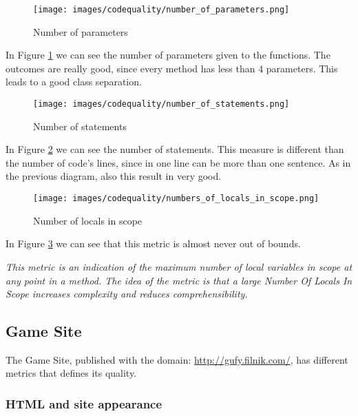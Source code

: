 \begin{figure}[H]
\centering %
\texttt{[image: images/codequality/number\_of\_parameters.png]}
\caption{Number of parameters}
\label{fig:numberOfParameters}
\end{figure}

In Figure \ref{fig:numberOfParameters} we can see the number of parameters given to the functions. The outcomes are really good, since every method has less than 4 parameters. This leads to a good class separation.

\begin{figure}[H]
\centering %
\texttt{[image: images/codequality/number\_of\_statements.png]}
\caption{Number of statements}
\label{fig:numberOfStatements}
\end{figure}

In Figure \ref{fig:numberOfStatements} we can see the number of statements. This measure is different than the number of code's lines, since in one line can be more than one sentence. As in the previous diagram, also this result in very good.

\begin{figure}[H]
\centering %
\texttt{[image: images/codequality/numbers\_of\_locals\_in\_scope.png]}
\caption{Number of locals in scope}
\label{fig:numberOfLocalsInScope}
\end{figure}

In Figure \ref{fig:numberOfLocalsInScope} we can see that this metric is almost never out of bounds.

\textit{This metric is an indication of the maximum number of local variables in scope at any point in a method. The idea of the metric is that a large Number Of Locals In Scope increases complexity and reduces comprehensibility.}\cite{website:eclipse-metrics}

\subsection{Game Site}

The Game Site, published with the domain: \url{http://gufy.filnik.com/}, has different metrics that defines its quality.

\subsubsection{HTML and site appearance}

